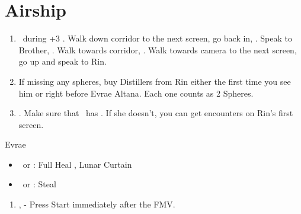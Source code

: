 \chapter{Airship}

\begin{enumerate}
  \item \sd\ during \cs+3 \skippablefmv. Walk down corridor to the next screen, go back in, \sd. Speak to Brother, \sd. Walk towards corridor, \sd. Walk towards camera to the next screen, go up and speak to Rin.
  \item If missing any spheres, buy Distillers from Rin either the first time you see him or right before Evrae Altana. Each one counts as 2 Spheres.
  \item \save. Make sure that \rikku\ has \od. If she doesn't, you can get encounters on Rin's first screen.
\end{enumerate}
\begin{battle}[32000]{Evrae}
  \begin{itemize}
            \tidusf Haste \tidus
            \tidusf Cheer x2
            \tidusf Equip Baroque Sword
            \tidusf Attack x6
            \rikkuf \od\ Mix Luck Sphere + Map
            \item \kimahri\ or \rikku: Full Heal \tidus, Lunar Curtain \tidus
            \item \kimahri\ or \rikku: Steal
  \end{itemize}
\end{battle}
\begin{enumerate}[resume]
  \item \sd, \skippablefmv[3:00] - Press Start immediately after the FMV.
\end{enumerate}